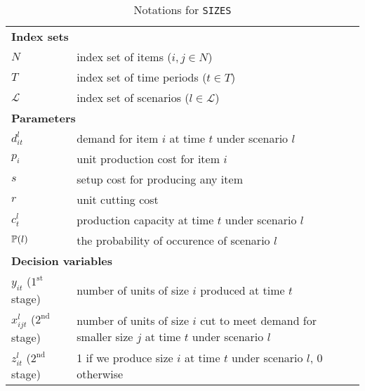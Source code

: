 \begin{table}[H]
	\caption{Notations for \texttt{SIZES}}
	\label{sizes:notation}
	\resizebox{\textwidth}{!}
	{
		\begin{tabular}{ll}
			\toprule
			\multicolumn{2}{l}{\textbf{Index sets}} \\
			$N$ & \textrm{index set of items ($i,j\in N$)} \\ 
			$T$ & \textrm{index set of time periods ($t\in T$)} \\ 
			$\mathcal{L}$ & \textrm{index set of scenarios ($l\in\mathcal{L}$)}\\ \midrule
			\multicolumn{2}{l}{\textbf{Parameters}} \\
			$d_{it}^l$ &	demand for item $i$ at time $t$ under scenario $l$\\
			$p_{i}$ & unit production cost for item $i$\\
			$s$	& setup cost for producing any item\\
			$r$ & unit cutting cost\\ 
			$c_{t}^l$ & production capacity at time $t$ under scenario $l$\\
			$\operatorname*{\mathbb{P}}(l)$ & the probability of occurence of scenario $l$\\ \midrule
			\multicolumn{2}{l}{\textbf{Decision variables}} \\
			$y_{it}$ ($1^{\textrm{st}}$ stage)  & number of units of size $i$ produced at time $t$ \\
			$x_{ijt}^l$ ($2^{\textrm{nd}}$ stage) & number of units of size $i$ cut to meet demand for smaller size $j$ at time $t$ under scenario $l$\\ 
			$z_{it}^l$ ($2^{\textrm{nd}}$ stage)& 1 if we produce size $i$ at time $t$ under scenario $l$, 0 otherwise\\
			\bottomrule
		\end{tabular}
	}
\end{table} 
